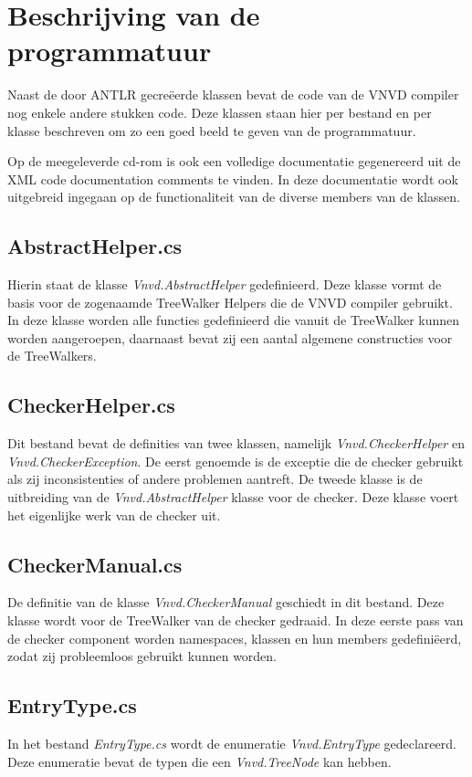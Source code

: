 \section{Beschrijving van de programmatuur}
Naast de door ANTLR gecre\"eerde klassen bevat de code van de VNVD compiler nog enkele andere stukken code. Deze klassen staan hier per bestand en per klasse beschreven om zo een goed beeld te geven van de programmatuur.

Op de meegeleverde cd-rom is ook een volledige documentatie gegenereerd uit de XML code documentation comments te vinden. In deze documentatie wordt ook uitgebreid ingegaan op de functionaliteit van de diverse members van de klassen.

\subsection{AbstractHelper.cs}
Hierin staat de klasse \textit{Vnvd.AbstractHelper} gedefinieerd. Deze klasse vormt de basis voor de zogenaamde TreeWalker Helpers die de VNVD compiler gebruikt. In deze klasse worden alle functies gedefinieerd die vanuit de TreeWalker kunnen worden aangeroepen, daarnaast bevat zij een aantal algemene constructies voor de TreeWalkers.

\subsection{CheckerHelper.cs}
Dit bestand bevat de definities van twee klassen, namelijk \textit{Vnvd.CheckerHelper} en \textit{Vnvd.CheckerException}. De eerst genoemde is de exceptie die de checker gebruikt als zij inconsistenties of andere problemen aantreft. De tweede klasse is de uitbreiding van de \textit{Vnvd.AbstractHelper} klasse voor de checker. Deze klasse voert het eigenlijke werk van de checker uit.

\subsection{CheckerManual.cs}
De definitie van de klasse \textit{Vnvd.CheckerManual} geschiedt in dit bestand. Deze klasse wordt voor de TreeWalker van de checker gedraaid. In deze eerste pass van de checker component worden namespaces, klassen en hun members gedefini\"eerd, zodat zij probleemloos gebruikt kunnen worden.

\subsection{EntryType.cs}
In het bestand \textit{EntryType.cs} wordt de enumeratie \textit{Vnvd.EntryType} gedeclareerd. Deze enumeratie bevat de typen die een \textit{Vnvd.TreeNode} kan hebben.

